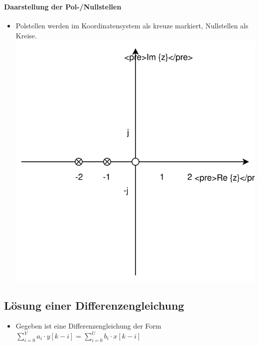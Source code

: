 \documentclass[11pt]{article}
\makeatletter
\def\maxwidth{\ifdim\Gin@nat@width>\linewidth\linewidth
    \else\Gin@nat@width\fi}
\let\Oldincludegraphics\includegraphics
\renewcommand{\includegraphics}[1]{\Oldincludegraphics[width=.8\maxwidth]{#1}}
\providecommand{\tightlist}{%
      \setlength{\itemsep}{0pt}\setlength{\parskip}{0pt}}
\makeatother
\begin{document}
    \begin{center}
    \end{center}
    { \hspace*{\fill} \\}
    
    \paragraph{Daarstellung der
Pol-/Nullstellen}\label{daarstellung-der-pol-nullstellen}

\begin{itemize}
\tightlist
\item
  Polstellen werden im Koordinatensystem als kreuze markiert,
  Nullstellen als Kreise. \includegraphics{Pol_Null_S.svg}
\end{itemize}

    \subsection{Lösung einer
Differenzengleichung}\label{luxf6sung-einer-differenzengleichung}

\begin{itemize}
\tightlist
\item
  Gegeben ist eine Differenzengleichung der Form
  \(\sum_{i=0}^V a_i \cdot y[k-i] = \sum_{i=0}^U b_i \cdot x[k-i]\)
\end{itemize}
\end{document}

